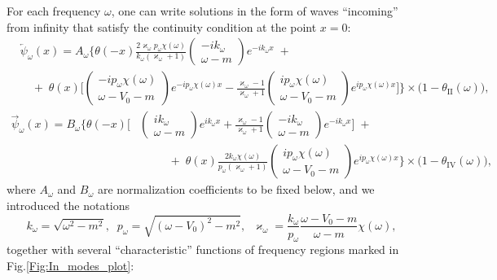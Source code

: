 \documentclass[12pt]{article}
\newcommand\beq{\begin{equation}}
\newcommand\eeq{\end{equation}}
\def\kw{k_{\omega}} \def\pw{p_{\omega}}
\def\kappaw{\varkappa_{\omega}}
\def\psiwR{\overrightarrow{\psi}_{\omega}}
\def\psiwL{\overleftarrow{\psi}_{\omega}}
\def\w{\omega}
\def\II{\mathrm{II}}
\def\IV{\mathrm{IV}}
\numberwithin{equation}{section}
\begin{document}
For each frequency $\omega$, one can write solutions in the form of waves ``incoming'' from infinity that satisfy the continuity condition at the point $x=0$:
\beq\label{eq:in_modes_left}
\begin{aligned}
    &\psiwL(x) = A_{\omega}\Bigg\{ \theta(-x)\frac{2\kappaw\pw\chi(\omega)}{\kw\left(\kappaw+1\right)}
    \begin{pmatrix}
        -i\kw \\
        \omega -m
    \end{pmatrix}e^{-i\kw x} \;+
    \\
    &\quad+\;\theta(x)\Bigg[
    \begin{pmatrix}
        -i\pw\chi(\w)\\
        \omega-V_0 -m
    \end{pmatrix}e^{-i\pw \chi(\w)x} - \frac{\kappaw-1}{\kappaw+1} \begin{pmatrix}
        i\pw\chi(\w)\\
        \omega-V_0 -m
    \end{pmatrix}e^{i\pw\chi(\w) x}\Bigg]\Bigg\}\times\big(1-\theta_{\II}(\omega)\big),
\end{aligned}
\eeq
\beq\label{eq:in_modes_right}
\begin{aligned}
    \psiwR(x) = B_{\omega}\Bigg\{ \theta(-x)\Bigg[
    &\begin{pmatrix}
        i\kw\\
        \omega -m
    \end{pmatrix}e^{i\kw x} + \frac{\kappaw-1}{\kappaw+1} \begin{pmatrix}
        -i\kw\\
        \omega -m
    \end{pmatrix}e^{-i\kw x}\Bigg] \;+
    \\
    &\quad\quad\;\;+\;\theta(x)\frac{2\kw\chi(\omega)}{\pw\left(\kappaw+1\right)}
    \begin{pmatrix}
        i\pw\chi(\omega)\\
        \omega-V_0 -m
    \end{pmatrix}e^{i\pw\chi(\omega)x}\Bigg\}\times\big(1-\theta_{\IV}(\omega)\big),
\end{aligned}
\eeq
where $A_{\omega}$ and $B_{\omega}$ are normalization coefficients to be fixed below, and we introduced the notations
\beq\label{eq:notations}
    \kw = \sqrt{\omega^2-m^2},\;\;\pw = \sqrt{(\omega-V_0)^2-m^2},\;\; \kappaw = \frac{\kw}{\pw}\frac{\omega-V_0-m}{\omega-m}\chi(\w),
\eeq
together with several ``characteristic'' functions of frequency regions marked in Fig.\ref{Fig:In_modes_plot}:
\end{document}
